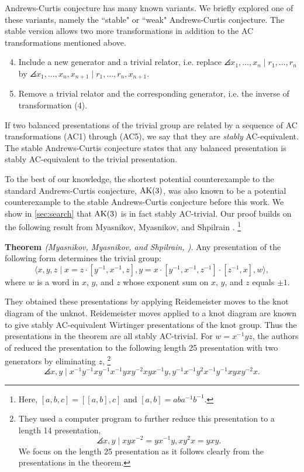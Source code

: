 Andrews-Curtis conjecture has many known variants.  We briefly explored one of these variants, namely the ``stable" or ``weak" Andrews-Curtis conjecture.
The stable version allows two more transformations in addition to the AC transformations mentioned above. 

\begin{enumerate}[label=(AC\arabic*)]
	\setcounter{enumi}{3}
	\item Include a new generator and a trivial relator, i.e. replace $\angles{x_1, \dots, x_n \mid r_1, \dots, r_n}$ by $\angles{x_1, \dots, x_n, x_{n+1} \mid r_1, \dots, r_n, x_{n+1}}$.
	\item Remove a trivial relator and the corresponding generator, i.e. the inverse of transformation (4). 
\end{enumerate}

If two balanced presentations of the trivial group are related by a sequence of AC transformations (AC1) through (AC5), we say that they are \textit{stably} AC-equivalent. The stable Andrews-Curtis conjecture states that any balanced presentation is stably AC-equivalent to the trivial presentation. 
\newline 

To the best of our knowledge, the shortest potential counterexample to the standard Andrews-Curtis conjecture, $\text{AK}(3)$, was also known to be a potential counterexample to the stable Andrews-Curtis conjecture before this work. We show in  \autoref{sec:search} that $\text{AK}(3)$ is in fact stably AC-trivial. Our proof builds on the following result from Myasnikov, Myasnikov, and Shpilrain \cite{MMS}.
\footnote{Here, $[a, b, c] = [[a, b], c]$ and $[a, b] = a b a^{-1} b^{-1}$.}
\newline

\textbf{Theorem \label{theorem:MMS}} \emph{(Myasnikov, Myasnikov, and Shpilrain, \cite{MMS})}.  
Any presentation of the following form determines the trivial group:
\[
\langle x, y, z \mid x = z \cdot [y^{-1}, x^{-1}, z], y = x \cdot [y^{-1}, x^{-1}, z^{-1}] \cdot [z^{-1}, x], w \rangle,
\]
where $w$ is a word in $x$, $y$, and $z$ whose exponent sum on $x$, $y$, and $z$ equals $\pm 1$.
\newline 

They obtained these presentations by applying Reidemeister moves to the knot diagram of the unknot. Reidemeister moves applied to a knot diagram are known to give stably AC-equivalent Wirtinger presentations of the knot group. Thus the presentations in the theorem are all stably AC-trivial. For 
$w = x^{-1}yz$, the authors of \cite{MMS} reduced the presentation to the following length 25 presentation with two generators by eliminating $z$, 
\footnote{
They used a computer program to further reduce this presentation to a length 14 presentation, 
\[
\angles{x, y \mid x y x^{-2} = y x^{-1} y, xy^2 x = y x y}.
\]
We focus on the length 25 presentation as it follows clearly from the presentations in the theorem.
}
\[
\angles{ x, y \mid 
x^{-1}y^{-1}xy^{-1}x^{-1}yxy^{-2}xyx^{-1}y, 
y^{-1}x^{-1}y^2x^{-1}y^{-1}xyxy^{-2}x }.
\]

